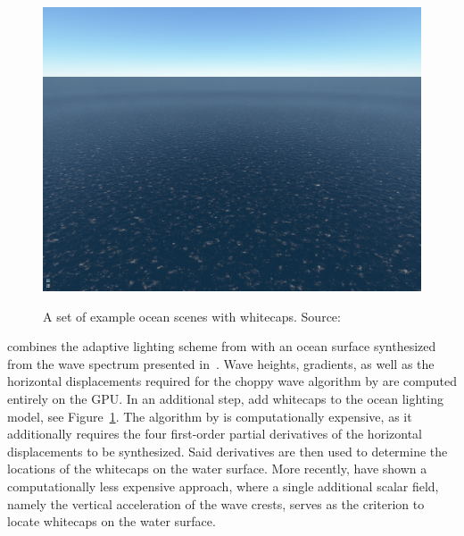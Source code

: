 \begin{figure}
{  \includegraphics[scale=0.125]{figures/Real-time_Animation_and_Rendering_of_Ocean_Whitecaps-004.png}
 }
\caption[Ocean whitecaps by \cite{article:whitecaps}.]{
A set of example ocean scenes with whitecaps. Source:~\cite{article:whitecaps}
}
\label{fig:dupuy:whitecaps}
\end{figure}
%
%
\citet{misc:oceanlightingfft} combines the adaptive lighting scheme
from \citet{article:oceanlighting} with an ocean surface synthesized
from the wave spectrum presented in~\citet{article:Elfouhaily1997}.
Wave heights, gradients, as well as the horizontal displacements
required for the choppy wave algorithm by \citet{course:simulatingocean}
are computed entirely on the GPU. 
\textcolor{changed}{In an additional step,
\citet{article:whitecaps} add whitecaps to the ocean lighting model,
see Figure~\ref{fig:dupuy:whitecaps}.
The algorithm by \citeauthor{article:whitecaps} is computationally
expensive, as it additionally requires the four first-order partial
derivatives of the horizontal displacements to be synthesized. Said
derivatives are then used to determine the locations of the whitecaps
on the water surface.
More recently, \citet{Chen:2017} have shown a computationally less
expensive approach, where a single additional scalar field, namely
the vertical acceleration of the wave crests, serves as the criterion
to locate whitecaps on the water surface.
}

